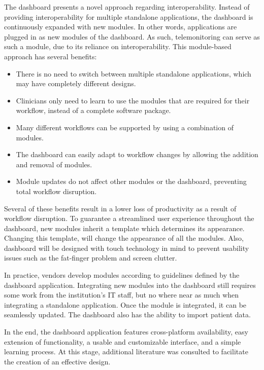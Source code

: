     The dashboard presents a novel approach regarding interoperability. Instead of providing interoperability for multiple standalone applications, the dashboard is continuously expanded with new modules. In other words, applications are plugged in as new modules of the dashboard. As such, telemonitoring can serve as such a module, due to its reliance on interoperability. This module-based approach has several benefits:
    \begin{itemize}
        \item There is no need to switch between multiple standalone applications, which may have completely different designs.
        \item Clinicians only need to learn to use the modules that are required for their workflow, instead of a complete software package.
        \item Many different workflows can be supported by using a combination of modules.
        \item The dashboard can easily adapt to workflow changes by allowing the addition and removal of modules.
        \item Module updates do not affect other modules or the dashboard, preventing total workflow disruption.
    \end{itemize}

    \noindent Several of these benefits result in a lower loss of productivity as a result of workflow disruption. To guarantee a streamlined user experience throughout the dashboard, new modules inherit a template which determines its appearance. Changing this template, will change the appearance of all the modules. Also, dashboard will be designed with touch technology in mind to prevent usability issues such as the fat-finger problem and screen clutter.

    In practice, vendors develop modules according to guidelines defined by the dashboard application. Integrating new modules into the dashboard still requires some work from the institution's IT staff, but no where near as much when integrating a standalone application. Once the module is integrated, it can be seamlessly updated. The dashboard also has the ability to import patient data.\bigskip

    \noindent In the end, the dashboard application features cross-platform availability, easy extension of functionality, a usable and customizable interface, and a simple learning process. At this stage, additional literature was consulted to facilitate the creation of an effective design.

